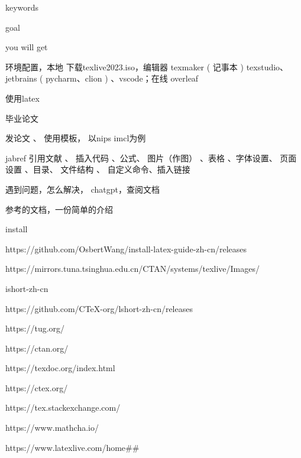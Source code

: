 \documentclass[11pt]{ctexart}
\begin{document}
keywords

goal

you will get

环境配置，本地  下载texlive2023.iso，编辑器 texmaker ( 记事本 ) texstudio、jetbrains ( pycharm、clion ) 、vscode；在线 overleaf

使用latex

毕业论文

发论文 、 使用模板， 以nips imcl为例


jabref 引用文献 、  插入代码 、公式、  图片（作图） 、表格  、字体设置、 页面设置 、目录、 文件结构 、 自定义命令、插入链接

遇到问题，怎么解决， chatgpt，查阅文档

参考的文档，一份简单的介绍


install

https://github.com/OsbertWang/install-latex-guide-zh-cn/releases

https://mirrors.tuna.tsinghua.edu.cn/CTAN/systems/texlive/Images/

ishort-zh-cn

https://github.com/CTeX-org/lshort-zh-cn/releases



https://tug.org/

https://ctan.org/

https://texdoc.org/index.html

https://ctex.org/

https://tex.stackexchange.com/

https://www.mathcha.io/

https://www.latexlive.com/home\#\#
\end{document}
